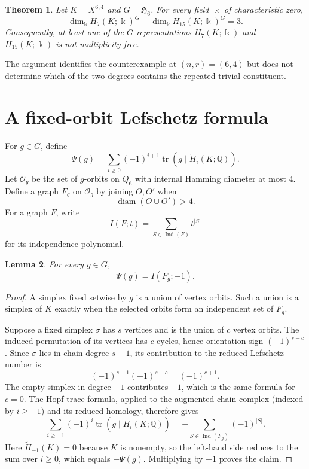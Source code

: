 \documentclass[11pt]{amsart}
\newtheorem{theorem}{Theorem}
\newtheorem{lemma}[theorem]{Lemma}
\newcommand{\Q}{\mathbb Q}
\newcommand{\Ind}{\operatorname{Ind}}
\newcommand{\diameter}{\operatorname{diam}}
\begin{document}
\begin{theorem}\label{thm:main}
Let $K=X^{6,4}$ and $G=\mathfrak H_6$. For every field $\Bbbk$ of
characteristic zero,
\[
\dim_{\Bbbk}H_7(K;\Bbbk)^G+
\dim_{\Bbbk}H_{15}(K;\Bbbk)^G=3.
\]
Consequently, at least one of the $G$-representations $H_7(K;\Bbbk)$ and
$H_{15}(K;\Bbbk)$ is not multiplicity-free.
\end{theorem}

The argument identifies the counterexample at $(n,r)=(6,4)$ but does not
determine which of the two degrees contains the repeated trivial constituent.

\section{A fixed-orbit Lefschetz formula}

For $g\in G$, define
\[
\Psi(g)=\sum_{i\ge0}(-1)^{i+1}
\operatorname{tr}\!\left(g\mid\widetilde H_i(K;\Q)\right).
\]
Let $\mathcal O_g$ be the set of $g$-orbits on $Q_6$ with internal Hamming
diameter at most $4$. Define a graph $F_g$ on $\mathcal O_g$ by joining
$O,O'$ when
\[
\diameter(O\cup O')>4.
\]
For a graph $F$, write
\[
I(F;t)=\sum_{S\in\Ind(F)}t^{|S|}
\]
for its independence polynomial.

\begin{lemma}\label{lem:fixed-orbit}
For every $g\in G$,
\[
\Psi(g)=I(F_g;-1).
\]
\end{lemma}

\begin{proof}
A simplex fixed setwise by $g$ is a union of vertex orbits. Such a union is a
simplex of $K$ exactly when the selected orbits form an independent set of
$F_g$.

Suppose a fixed simplex $\sigma$ has $s$ vertices and is the union of $c$
vertex orbits. The induced permutation of its vertices has $c$ cycles, hence
orientation sign $(-1)^{s-c}$. Since $\sigma$ lies in chain degree $s-1$, its
contribution to the reduced Lefschetz number is
\[
(-1)^{s-1}(-1)^{s-c}=(-1)^{c+1}.
\]
The empty simplex in degree $-1$ contributes $-1$, which is the same formula
for $c=0$. The Hopf trace formula, applied to the augmented chain complex
(indexed by $i\ge-1$) and its reduced homology, therefore gives
\[
\sum_{i\ge-1}(-1)^i\operatorname{tr}
 \left(g\mid\widetilde H_i(K;\Q)\right)
=-\sum_{S\in\Ind(F_g)}(-1)^{|S|}.
\]
Here $\widetilde H_{-1}(K)=0$ because $K$ is nonempty, so the left-hand side
reduces to the sum over $i\ge0$, which equals $-\Psi(g)$.
Multiplying by $-1$ proves the claim.
\end{proof}
\end{document}
